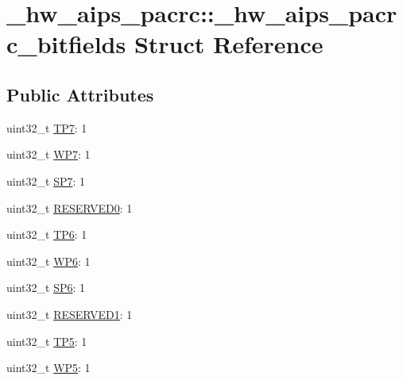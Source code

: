 \hypertarget{struct__hw__aips__pacrc_1_1__hw__aips__pacrc__bitfields}{}\section{\+\_\+hw\+\_\+aips\+\_\+pacrc\+:\+:\+\_\+hw\+\_\+aips\+\_\+pacrc\+\_\+bitfields Struct Reference}
\label{struct__hw__aips__pacrc_1_1__hw__aips__pacrc__bitfields}
\subsection*{Public Attributes}
\begin{DoxyCompactItemize}
\item 
uint32\+\_\+t \hyperlink{struct__hw__aips__pacrc_1_1__hw__aips__pacrc__bitfields_a8872a16a3ae41b81cbbc5ffb605d97b1}{T\+P7}\+: 1
\item 
uint32\+\_\+t \hyperlink{struct__hw__aips__pacrc_1_1__hw__aips__pacrc__bitfields_afb776e02669ced81b66c844b7e4cb7ae}{W\+P7}\+: 1
\item 
uint32\+\_\+t \hyperlink{struct__hw__aips__pacrc_1_1__hw__aips__pacrc__bitfields_a310d681dd62a867662e4dc36c6db4887}{S\+P7}\+: 1
\item 
uint32\+\_\+t \hyperlink{struct__hw__aips__pacrc_1_1__hw__aips__pacrc__bitfields_a685f328a9fcca51d5af954e89f37fba5}{R\+E\+S\+E\+R\+V\+E\+D0}\+: 1
\item 
uint32\+\_\+t \hyperlink{struct__hw__aips__pacrc_1_1__hw__aips__pacrc__bitfields_a61d53b85b0b264ce07713a2232fc80fd}{T\+P6}\+: 1
\item 
uint32\+\_\+t \hyperlink{struct__hw__aips__pacrc_1_1__hw__aips__pacrc__bitfields_a0e0375b62384402f93d783c0a6673d5e}{W\+P6}\+: 1
\item 
uint32\+\_\+t \hyperlink{struct__hw__aips__pacrc_1_1__hw__aips__pacrc__bitfields_a4f9052f7dc452cef05e730088295ddc0}{S\+P6}\+: 1
\item 
uint32\+\_\+t \hyperlink{struct__hw__aips__pacrc_1_1__hw__aips__pacrc__bitfields_a5281693419679c802ae00b3ce2025756}{R\+E\+S\+E\+R\+V\+E\+D1}\+: 1
\item 
uint32\+\_\+t \hyperlink{struct__hw__aips__pacrc_1_1__hw__aips__pacrc__bitfields_a6bf5db918b65c7862b35a90ca2677753}{T\+P5}\+: 1
\item 
uint32\+\_\+t \hyperlink{struct__hw__aips__pacrc_1_1__hw__aips__pacrc__bitfields_a8ced6ec70323b040cc83bed097600b13}{W\+P5}\+: 1

\end{DoxyCompactItemize}
